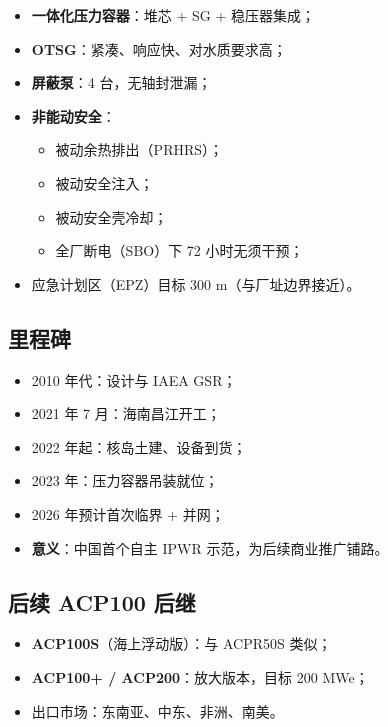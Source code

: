\documentclass[
  UTF8,
  scheme=plain,
  fontsize=10pt,
  openany
]{ctexbook}
\begin{document}
\begin{itemize}
\tightlist
\item
  \textbf{一体化压力容器}：堆芯 + SG + 稳压器集成；
\item
  \textbf{OTSG}：紧凑、响应快、对水质要求高；
\item
  \textbf{屏蔽泵}：4 台，无轴封泄漏；
\item
  \textbf{非能动安全}：

  \begin{itemize}
  \tightlist
  \item
    被动余热排出（PRHRS）；
  \item
    被动安全注入；
  \item
    被动安全壳冷却；
  \item
    全厂断电（SBO）下 72 小时无须干预；
  \end{itemize}
\item
  应急计划区（EPZ）目标 300 m（与厂址边界接近）。
\end{itemize}

\subsection{里程碑}\label{ux91ccux7a0bux7891-1}

\begin{itemize}
\tightlist
\item
  2010 年代：设计与 IAEA GSR；
\item
  2021 年 7 月：海南昌江开工；
\item
  2022 年起：核岛土建、设备到货；
\item
  2023 年：压力容器吊装就位；
\item
  2026 年预计首次临界 + 并网；
\item
  \textbf{意义}：中国首个自主 IPWR 示范，为后续商业推广铺路。
\end{itemize}

\subsection{后续 ACP100 后继}\label{ux540eux7eed-acp100-ux540eux7ee7}

\begin{itemize}
\tightlist
\item
  \textbf{ACP100S}（海上浮动版）：与 ACPR50S 类似；
\item
  \textbf{ACP100+ / ACP200}：放大版本，目标 200 MWe；
\item
  出口市场：东南亚、中东、非洲、南美。
\end{itemize}
\end{document}
